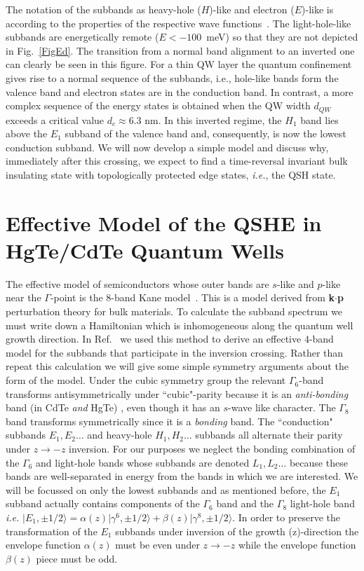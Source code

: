 \documentclass{article}
\begin{document}
The notation of the subbands as heavy-hole ($H$)-like and
electron ($E$)-like is according to the properties of the respective
wave functions~\cite{Pfeuffer}. The light-hole-like subbands are
energetically remote ($E<-100$~meV) so that they are not depicted in
Fig.~\ref{FigEd}. The transition from a normal band alignment to an
inverted one can clearly be seen in this figure. For a thin QW layer
the quantum confinement gives rise to a normal sequence of the
subbands, i.e., hole-like bands form the valence band and electron
states are in the conduction band. In contrast, a more complex
sequence of the energy states is obtained when the QW width $d_{QW}$
exceeds a critical value $d_{c}\approx 6.3$ nm. In this inverted
regime, the $H_1$ band lies above the $E_1$ subband of the valence
band and, consequently, is now the lowest conduction subband. We
will now develop a simple model and discuss why, immediately after
this crossing, we expect to find a time-reversal invariant bulk
insulating state with topologically protected edge states,
\emph{i.e.}, the QSH state.

\section{Effective Model of the QSHE in HgTe/CdTe Quantum Wells}
The effective model of semiconductors whose outer bands are $s$-like
and $p$-like near the $\Gamma$-point is the $8$-band Kane
model~\cite{kane1957}. This is a model derived from {\bf k$\cdot$p}
perturbation theory for  bulk materials. To calculate the subband
spectrum we must write down a Hamiltonian which is inhomogeneous
along the quantum well growth direction. In
Ref.~\cite{Bernevig2006d} we used this method to derive an effective
$4$-band model for the subbands that participate in the inversion
crossing. Rather than repeat this calculation we will give some
simple symmetry arguments about the form of the model. Under the
cubic symmetry group the relevant $\Gamma_6$-band transforms
antisymmetrically under ``cubic"-parity because it is an
\emph{anti-bonding} band (in CdTe \emph{and} HgTe) , even though it
has an $s$-wave like character. The $\Gamma_8$ band transforms
symmetrically since it is a \emph{bonding} band. The ``conduction"
subbands $E_1,E_2\ldots$ and heavy-hole $H_1,H_2\ldots$ subbands all
alternate their parity under $z\to -z$ inversion.  For our purposes
we neglect the bonding combination of the $\Gamma_6$ and light-hole
bands whose subbands are denoted $L_1,L_2\ldots$ because these bands
are well-separated in energy from the bands in which we are
interested. We will be focussed on only the lowest subbands and as
mentioned before, the $E_1$ subband actually contains components of
the $\Gamma_6$ band and the $\Gamma_8$ light-hole band \emph{i.e.}
$\vert E_1,\pm 1/2\rangle= \alpha(z) \vert \gamma^6,\pm
1/2\rangle+\beta(z)\vert \gamma^8,\pm 1/2\rangle.$ In order to
preserve the transformation of the $E_1$ subbands under inversion of
the growth (z)-direction the envelope function $\alpha(z)$ must be
even under $z\to -z$ while the envelope function $\beta(z)$ piece
must be odd.
\end{document}
